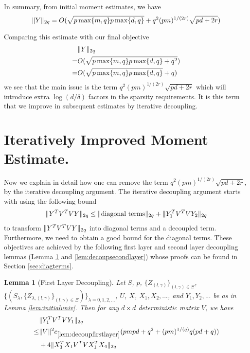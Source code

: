 \documentclass[11pt]{amsart}
\numberwithin{equation}{section}
\numberwithin{equation}{section}
\DeclarePairedDelimiter{\norm}{\lVert}{\rVert}
\newtheorem{lemma}[theorem]{Lemma}
\begin{document}
In summary, from initial moment estimates, we have
\begin{align}
    \norm{Y}_{2q} =  O(\sqrt{p\max\{m,q\}p\max\{d,q\}} + q^{2}(pm)^{1/(2r)}\sqrt{pd+2r}) \label{eq:bvhmombound}
\end{align}

Comparing this estimate with our final objective
\begin{align*}
    &\norm{Y}_{2q} \\=&  O(\sqrt{p\max\{m,q\}p\max\{d,q\}+q^2})
    \\=&  O(\sqrt{p\max\{m,q\}p\max\{d,q\}}+q)
\end{align*}
we see that the main issue is the term $q^{2}(pm)^{1/(2r)}\sqrt{pd+2r}$ which will introduce extra $\log (d/\delta)$ factors in the sparsity requirements. It is this term that we improve in subsequent estimates by iterative decoupling.





\section{Iteratively Improved Moment Estimate.}\label{sec:iterdecoup}

Now we explain in detail how one can remove the term $q^{2}(pm)^{1/(2r)}\sqrt{pd+2r}$, by the iterative decoupling argument. The iterative decoupling argument starts with using the following bound
\begin{align*}
    \norm{Y^TV^TVY}_{2q} \le \norm{\text{diagonal terms}}_{2q}+\norm{Y_1^TV^TVY_2}_{2q}
\end{align*}
to transform $\norm{Y^TV^TVY}_{2q}$ into diagonal terms and a decoupled term. Furthermore, we need to obtain a good bound for the diagonal terms. These objectives are achieved by the following first layer and second layer decoupling lemmas (Lemma \ref{lem:decoupfirstlayer} and \ref{lem:decoupsecondlayer}) whose proofs can be found in Section \ref{sec:diagterms}.

\begin{lemma}[First Layer Decoupling]\label{lem:decoupfirstlayer}
Let $S$, $p$, $\{Z_{(l,\gamma)}\}_{(l,\gamma) \in \Xi}$, $\{(S_{\lambda},\{Z_{\lambda,(l,\gamma)}\}_{(l,\gamma) \in \Xi})\}_{\lambda=0,1,2,...}$, $U$, $X$, $X_1,X_2,...$, and $Y_1,Y_2,...$ be as in Lemma \ref{lem:initialuniv}.
Then for any $d \times d$ deterministic matrix $V$, we have
\begin{align*}
    &\norm{Y_1^TV^TVY_1}_{2q} \\ \le&
    \norm{V}^2 c_{\ref{lem:decoupfirstlayer}}(pmpd+q^2+(pm)^{1/(q)}q(pd+q))\\&+4\norm{X_3^TX_1V^TVX_1^TX_4}_{2q}
\end{align*}

\end{lemma}
\end{document}
